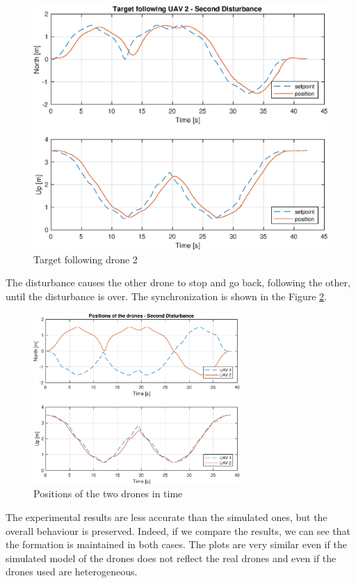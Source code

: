 \begin{figure}
\centering
\includegraphics[width=0.7\linewidth]{chapters/chapter-05/figures/following_2_2.eps}
\caption{Target following drone 2}
\label{fig:exp_following_2_2}
\end{figure}

The disturbance causes the other drone to stop and go back, following the other,
until the disturbance is over.
The synchronization is shown in the Figure \ref{fig:exp_overlapped_2}.

\begin{figure}
\centering
\includegraphics[width=0.7\textwidth]{chapters/chapter-05/figures/overlapped_2.eps}
\caption{Positions of the two drones in time}
\label{fig:exp_overlapped_2}
\end{figure}

The experimental results are less accurate than the simulated ones,
but the overall behaviour is preserved. Indeed, if we compare the results, we
can see that the formation is maintained in both cases. The plots are very similar
even if the simulated model of the drones does not reflect the real drones and even if
the drones used are heterogeneous.
